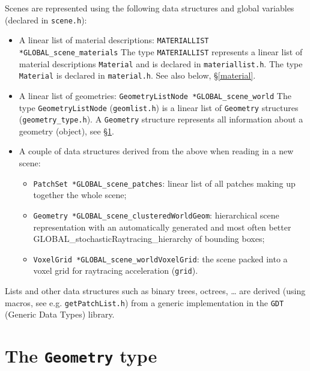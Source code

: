 \documentclass[11pt]{report}
\begin{document}
Scenes are represented using the following data structures and global
variables (declared in {\tt scene.h}):
\begin{itemize}
\item   A linear list of material descriptions:
        \newline
        {\tt MATERIALLIST *GLOBAL_scene_materials}
        \newline
        The type {\tt MATERIALLIST} represents a linear list of material
        descriptions {\tt Material} and is declared in
        {\tt materiallist.h}. The type {\tt Material} is declared in
        {\tt material.h}. See also below, \S\ref{material}.
\item   A linear list of geometries:
        \newline
        {\tt GeometryListNode *GLOBAL_scene_world}
        \newline
        The type {\tt GeometryListNode} ({\tt geomlist.h}) is a
        linear list of {\tt Geometry} structures ({\tt geometry\_type.h}).
        A {\tt Geometry} structure represents all information about a
        geometry (object), see \S\ref{geometry}.
\item   A couple of data structures derived from the above when
  reading in a new scene:
  \begin{itemize}
  \item {\tt PatchSet *GLOBAL_scene_patches}: linear list of all patches making up together
    the whole scene;
  \item {\tt Geometry *GLOBAL_scene_clusteredWorldGeom}: hierarchical scene representation with
    an automatically generated and most often better GLOBAL_stochasticRaytracing_hierarchy of bounding
    boxes;
  \item{\tt VoxelGrid *GLOBAL_scene_worldVoxelGrid}: the scene packed into a voxel grid for
    raytracing acceleration ({\tt grid}).
  \end{itemize}
\end{itemize}
Lists and other data structures such as binary trees, octrees, \ldots
are derived (using macros, see e\@.g\@. {\tt getPatchList.h})
from a generic implementation in the {\tt GDT} (Generic Data Types) library.

\section{The {\tt Geometry} type}
\label{geometry}
\end{document}
